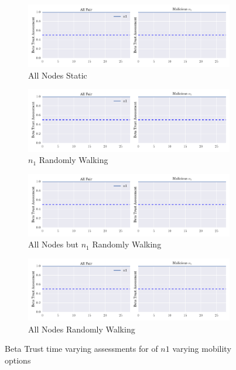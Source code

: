 \documentclass[runningheads,a4paper]{llncs}
\begin{document}
{{\begin{figure}
\begin{subfigure}{\textwidth}
  \centering
  \includegraphics[width=.8\linewidth]{img/beta_trust_bella_static_joint.pdf}
  \caption{All Nodes Static}
  \label{fig:beta_trust_static}
\end{subfigure}
\begin{subfigure}{\textwidth}
  \centering
  \includegraphics[width=.8\linewidth]{img/beta_trust_bella_single_mobile_joint.pdf}
  \caption{$n_1$ Randomly Walking}
  \label{fig:beta_trust_single}
\end{subfigure}
\begin{subfigure}{\textwidth}
\centering
  \includegraphics[width=.8\linewidth]{img/beta_trust_bella_allbut1_mobile_joint.pdf}
  \caption{All Nodes but $n_1$ Randomly Walking}
  \label{fig:beta_trust_allbut1}
\end{subfigure}
\begin{subfigure}{\textwidth}
\centering
  \includegraphics[width=.8\linewidth]{img/beta_trust_bella_all_mobile_joint.pdf}
  \caption{All Nodes Randomly Walking}
  \label{fig:beta_trust_all_mobile}
\end{subfigure}
\caption{Beta Trust time varying assessments for of $n1$ varying mobility options}
\label{fig:trust_mobility}
\end{figure}

}}
\end{document}
